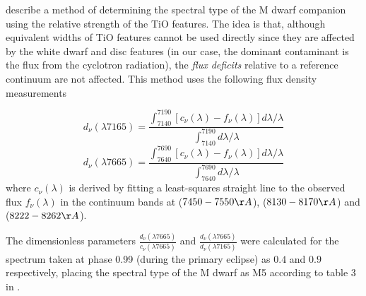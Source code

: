 \documentclass[a4paper,fleqn,usenatbib]{mnras}
\begin{document}
\citet{WadeHorne1988} describe a method of determining the spectral type of the M dwarf companion using the relative strength of the TiO features. The idea is that, although equivalent widths of TiO features cannot be used directly since they are affected by the white dwarf and disc features (in our case, the dominant contaminant is the flux from the cyclotron radiation), the \emph{flux deficits} relative to a reference continuum are not affected. This method uses the following flux density measurements

\begin{equation}
	d_{\nu}(\lambda7165) = \frac{\int_{7140}^{7190}[c_\nu(\lambda)-f_\nu(\lambda)]d\lambda/\lambda}{\int_{7140}^{7190}d\lambda/\lambda}
\end{equation}
\begin{equation}
	d_{\nu}(\lambda7665) = \frac{\int_{7640}^{7690}[c_\nu(\lambda)-f_\nu(\lambda)]d\lambda/\lambda}{\int_{7640}^{7690}d\lambda/\lambda}
\end{equation}
where $c_\nu(\lambda)$ is derived by fitting a least-squares straight line to the observed flux $f_\nu(\lambda)$ in the continuum bands at ($7450-7550\AA$), ($8130-8170\AA$) and ($8222-8262\AA$).

The dimensionless parameters $\frac{d_{\nu}(\lambda7665)}{c_\nu(\lambda7665)}$ and $\frac{d_{\nu}(\lambda7665)}{d_{\nu}(\lambda7165)}$ were calculated for the spectrum taken at phase 0.99 (during the primary eclipse) as $0.4$ and $0.9$ respectively, placing the spectral type of the M dwarf as M5 according to table 3 in \citet{WadeHorne1988}.   
\end{document}

